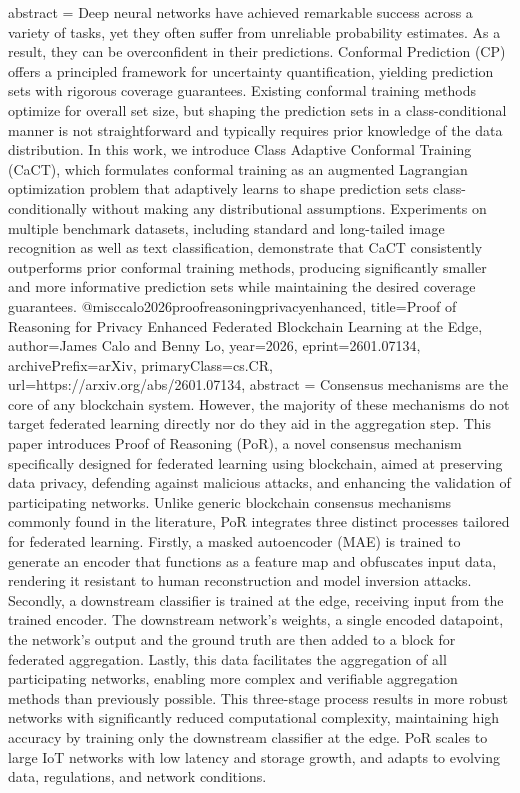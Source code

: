 {      abstract = {Deep neural networks have achieved remarkable success across a variety of tasks, yet they often suffer from unreliable probability estimates. As a result, they can be overconfident in their predictions. Conformal Prediction (CP) offers a principled framework for uncertainty quantification, yielding prediction sets with rigorous coverage guarantees. Existing conformal training methods optimize for overall set size, but shaping the prediction sets in a class-conditional manner is not straightforward and typically requires prior knowledge of the data distribution. In this work, we introduce Class Adaptive Conformal Training (CaCT), which formulates conformal training as an augmented Lagrangian optimization problem that adaptively learns to shape prediction sets class-conditionally without making any distributional assumptions. Experiments on multiple benchmark datasets, including standard and long-tailed image recognition as well as text classification, demonstrate that CaCT consistently outperforms prior conformal training methods, producing significantly smaller and more informative prediction sets while maintaining the desired coverage guarantees.}
}@misc{calo2026proofreasoningprivacyenhanced,
      title={Proof of Reasoning for Privacy Enhanced Federated Blockchain Learning at the Edge}, 
      author={James Calo and Benny Lo},
      year={2026},
      eprint={2601.07134},
      archivePrefix={arXiv},
      primaryClass={cs.CR},
      url={https://arxiv.org/abs/2601.07134},
      abstract = {Consensus mechanisms are the core of any blockchain system. However, the majority of these mechanisms do not target federated learning directly nor do they aid in the aggregation step. This paper introduces Proof of Reasoning (PoR), a novel consensus mechanism specifically designed for federated learning using blockchain, aimed at preserving data privacy, defending against malicious attacks, and enhancing the validation of participating networks. Unlike generic blockchain consensus mechanisms commonly found in the literature, PoR integrates three distinct processes tailored for federated learning. Firstly, a masked autoencoder (MAE) is trained to generate an encoder that functions as a feature map and obfuscates input data, rendering it resistant to human reconstruction and model inversion attacks. Secondly, a downstream classifier is trained at the edge, receiving input from the trained encoder. The downstream network's weights, a single encoded datapoint, the network's output and the ground truth are then added to a block for federated aggregation. Lastly, this data facilitates the aggregation of all participating networks, enabling more complex and verifiable aggregation methods than previously possible. This three-stage process results in more robust networks with significantly reduced computational complexity, maintaining high accuracy by training only the downstream classifier at the edge. PoR scales to large IoT networks with low latency and storage growth, and adapts to evolving data, regulations, and network conditions.}
}
